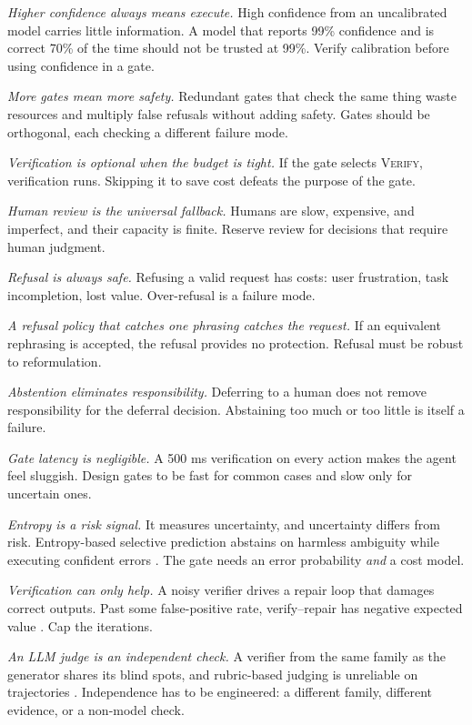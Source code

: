 \documentclass[11pt]{book}
\begin{document}
\textit{Higher confidence always means execute.} High confidence from an uncalibrated model carries little information. A model that reports 99\% confidence and is correct 70\% of the time should not be trusted at 99\%. Verify calibration before using confidence in a gate.

\textit{More gates mean more safety.} Redundant gates that check the same thing waste resources and multiply false refusals without adding safety. Gates should be orthogonal, each checking a different failure mode.

\textit{Verification is optional when the budget is tight.} If the gate selects \textsc{Verify}, verification runs. Skipping it to save cost defeats the purpose of the gate.

\textit{Human review is the universal fallback.} Humans are slow, expensive, and imperfect, and their capacity is finite. Reserve review for decisions that require human judgment.

\textit{Refusal is always safe.} Refusing a valid request has costs: user frustration, task incompletion, lost value. Over-refusal is a failure mode.

\textit{A refusal policy that catches one phrasing catches the request.} If an equivalent rephrasing is accepted, the refusal provides no protection. Refusal must be robust to reformulation.

\textit{Abstention eliminates responsibility.} Deferring to a human does not remove responsibility for the deferral decision. Abstaining too much or too little is itself a failure.

\textit{Gate latency is negligible.} A 500 ms verification on every action makes the agent feel sluggish. Design gates to be fast for common cases and slow only for uncertain ones.

\textit{Entropy is a risk signal.} It measures uncertainty, and uncertainty differs from risk. Entropy-based selective prediction abstains on harmless ambiguity while executing confident errors \cite{entropyinsuff2026}. The gate needs an error probability \textit{and} a cost model.

\textit{Verification can only help.} A noisy verifier drives a repair loop that damages correct outputs. Past some false-positive rate, verify--repair has negative expected value \cite{verifyrepair2026}. Cap the iterations.

\textit{An LLM judge is an independent check.} A verifier from the same family as the generator shares its blind spots, and rubric-based judging is unreliable on trajectories \cite{judgerubric2026}. Independence has to be engineered: a different family, different evidence, or a non-model check.
\end{document}
